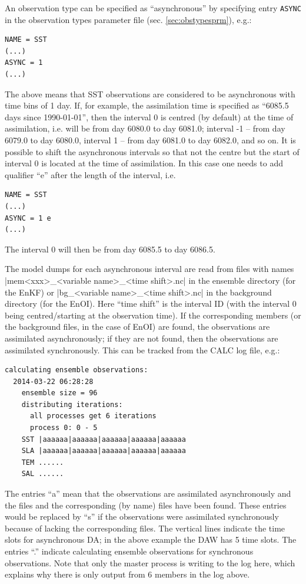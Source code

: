 \documentclass[11pt]{report}
\begin{document}
An observation type can be specified as ``asynchronous'' by specifying entry \verb|ASYNC| in the observation types parameter file (sec. \ref{sec:obstypesprm}), e.g.:
\begin{Verbatim}[frame=single,fontsize=\footnotesize]
NAME = SST
(...)
ASYNC = 1
(...)
\end{Verbatim}
The above means that SST observations are considered to be asynchronous with time bins of 1 day.
If, for example, the assimilation time is specified as ``6085.5 days since 1990-01-01'', then the interval 0 is centred (by default) at the time of assimilation, i.e. will be from day 6080.0 to day 6081.0; interval -1 -- from day 6079.0 to day 6080.0, interval 1 -- from day 6081.0 to day 6082.0, and so on.
It is possible to shift the asynchronous intervals so that not the centre but the start of interval 0 is located at the time of assimilation.
In this case one needs to add qualifier ``e'' after the length of the interval, i.e.
\begin{Verbatim}[frame=single,fontsize=\footnotesize]
NAME = SST
(...)
ASYNC = 1 e
(...)
\end{Verbatim}
The interval 0 will then be from day 6085.5 to day 6086.5.

The model dumps for each asynchronous interval are read from files with names \spverb|mem<xxx>_<variable name>_<time shift>.nc| in the ensemble directory (for the EnKF) or \spverb|bg_<variable name>_<time shift>.nc| in the background directory (for the EnOI).
Here ``time shift'' is the interval ID (with the interval 0 being centred/starting at the observation time).
If the corresponding members (or the background files, in the case of EnOI) are found, the observations are assimilated asynchronously; if they are not found, then the observations are assimilated synchronously.
This can be tracked from the CALC log file, e.g.:
\begin{Verbatim}[frame=single,fontsize=\footnotesize]
  calculating ensemble observations:
  2014-03-22 06:28:28
    ensemble size = 96
    distributing iterations:
      all processes get 6 iterations
      process 0: 0 - 5
    SST |aaaaaa|aaaaaa|aaaaaa|aaaaaa|aaaaaa
    SLA |aaaaaa|aaaaaa|aaaaaa|aaaaaa|aaaaaa
    TEM ......
    SAL ......
\end{Verbatim}
The entries ``a'' mean that the observations are assimilated asynchronously and the files and the corresponding (by name) files have been found.
These entries would be replaced by ``s'' if the observations were assimilated synchronously because of lacking the corresponding files.
The vertical lines indicate the time slots for asynchronous DA; in the above example the DAW has 5 time slots.
The entries ``.'' indicate calculating ensemble observations for synchronous observations.
Note that only the master process is writing to the log here, which explains why there is only output from 6 members in the log above.
\end{document}
